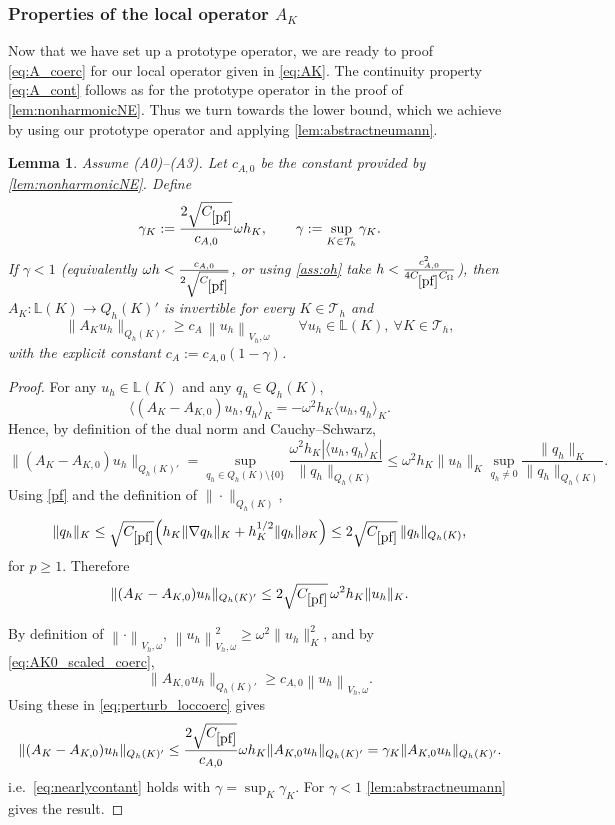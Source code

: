 \documentclass[11pt]{article}
\theoremstyle{definition}
\theoremstyle{plain}
\newtheorem{lemma}[theorem]{Lemma}
\newcommand{\cA}{c_A}
\newcommand{\const}[1]{C_{\eqref{#1}}}
\newcommand{\dgonorm}[1]{\norm{#1}_{V_h,\omega}}
\newcommand{\Th}{{\calT_h}}
\newcommand{\AK}{{A_K}}
\newcommand{\LKh}{\mathbb{L}(K)}
\newcommand{\QKh}{Q_h(K)}
\newcommand*{\norm}[1]{\left\|#1\right\|}
\newcommand{\calT}{\mathcal{T}}
\begin{document}
\subsubsection{Properties of the local operator \texorpdfstring{$A_{K}$}{AK}}\label{sec:AK}
Now that we have set up a prototype operator, we are ready to proof \eqref{eq:A_coerc} for our local operator given in \eqref{eq:AK}.
The continuity property \eqref{eq:A_cont} follows as for the prototype operator in the proof of \cref{lem:nonharmonicNE}.
Thus we turn towards the lower bound, which we achieve by using our prototype operator and applying \cref{lem:abstractneumann}.

\begin{lemma}\label{lem:loccoerc}
Assume \textup{(A0)}--\textup{(A3)}. 
Let $c_{A,0}$ be the constant provided by \cref{lem:nonharmonicNE}.
Define
\begin{equation}\label{eq:gamma_loccoerc}
    \gamma_K := \frac{2\sqrt{\const{pf}}}{c_{A,0}}\omega h_K,
\qquad
\gamma := \sup_{K\in\Th}\gamma_K .
\end{equation}
If $\gamma<1$ (equivalently $\omega h < \frac{c_{A,0}}{2\sqrt{\const{pf}}}$, or using
\eqref{ass:oh} take $h < \frac{c_{A,0}^2}{4\const{pf}C_\Omega}$), then $\AK:\LKh\to\QKh'$
is invertible for every $K\in\Th$ and
\begin{equation}\label{eq:loccoerc}
\|\AK u_h\|_{\QKh'} \ge \cA\,\dgonorm{u_h}
\qquad \forall u_h\in\LKh,\ \forall K\in\Th,
\end{equation}
with the explicit constant $\cA:=c_{A,0}(1-\gamma)$.
\end{lemma}
\begin{proof}
For any $u_h\in\LKh$ and any $q_h\in\QKh$,
\[
\langle (\AK-A_{K,0})u_h, q_h\rangle_K = -\omega^2 h_K\langle u_h,q_h\rangle_K.
\]
Hence, by definition of the dual norm and Cauchy--Schwarz,
\[
\|(\AK-A_{K,0})u_h\|_{\QKh'}
= \sup_{q_h\in\QKh\setminus\{0\}}
\frac{\omega^2 h_K|\langle u_h,q_h\rangle_K|}{\|q_h\|_{\QKh}}
\le \omega^2 h_K \|u_h\|_K \sup_{q_h\neq0}\frac{\|q_h\|_K}{\|q_h\|_{\QKh}}.
\]
Using \eqref{pf} and the definition of $\|\cdot\|_{\QKh}$,
\[
\|q_h\|_K
\le \sqrt{\const{pf}}\Big(h_K\|\nabla q_h\|_K + h_K^{1/2}\|q_h\|_{\partial K}\Big)
\le 2\sqrt{\const{pf}}\,\|q_h\|_{\QKh},
\]
for $p\ge1$. Therefore
\begin{equation}\label{eq:perturb_loccoerc}
    \|(\AK-A_{K,0})u_h\|_{\QKh'} \le 2\sqrt{\const{pf}}\,\omega^2 h_K \|u_h\|_K.
\end{equation}

By definition of $\dgonorm{\cdot}$, $\dgonorm{u_h}^2 \ge \omega^2\|u_h\|_K^2$, and by \eqref{eq:AK0_scaled_coerc},
\[
\|A_{K,0}u_h\|_{\QKh'} \ge c_{A,0} \dgonorm{u_h}.
\]
Using these in \eqref{eq:perturb_loccoerc} gives
\[
\|(\AK-A_{K,0})u_h\|_{\QKh'}
\le \frac{2\sqrt{\const{pf}}}{c_{A,0}}\omega h_K \|A_{K,0}u_h\|_{\QKh'}
= \gamma_K\|A_{K,0}u_h\|_{\QKh'}.
\]
i.e.\ \eqref{eq:nearlycontant} holds with $\gamma=\sup_K\gamma_K$.
For $\gamma<1$ \cref{lem:abstractneumann} gives the result.
\end{proof}
\end{document}
